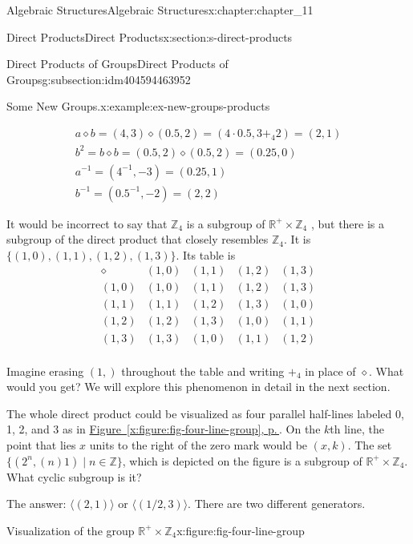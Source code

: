 \documentclass[twoside,10pt,]{book}
\newcommand{\xreffont}{\relax}
\numberwithin{equation}{section}
\begin{document}
\begin{chapterptx}{Algebraic Structures}{}{Algebraic Structures}{}{}{x:chapter:chapter_11}
\begin{sectionptx}{Direct Products}{}{Direct Products}{}{}{x:section:s-direct-products}
\begin{subsectionptx}{Direct Products of Groups}{}{Direct Products of Groups}{}{}{g:subsection:idm404594463952}
\begin{example}{Some New Groups.}{x:example:ex-new-groups-products}
\begin{enumerate}[label=(\alph*)]
\begin{equation*}
\begin{array}{c}
a \diamond  b = (4, 3) \diamond  (0.5, 2) = \left(4 \cdot  0.5, 3 +_4 2\right) = (2, 1)\\
b^2 = b \diamond  b = (0.5, 2) \diamond  (0.5, 2) = (0.25, 0)\\
a^{-1} = \left(4^{-1} , -3\right) = (0.25, 1)\\
b^{-1} = \left(0.5^{-1} , -2\right) = (2, 2)
\end{array}
\end{equation*}
%
\par
It would be incorrect to say that \(\mathbb{Z}_4\) is a subgroup of \(\mathbb{R}^+\times  \mathbb{Z}_4\) , but there is a subgroup of the direct product that closely resembles \(\mathbb{Z}_4\). It is \(\{(1, 0), (1, 1), (1, 2), (1, 3)\}\). Its table is%
\begin{equation*}
\begin{array}{c|cccc}
\diamond &(1, 0)& (1, 1)& (1, 2)& (1, 3)\\
\hline
(1, 0)&(1, 0)& (1, 1)& (1, 2)& (1, 3)\\
(1, 1)&(1, 1)& (1, 2)& (1, 3)& (1, 0)\\
(1, 2)&(1, 2)& (1, 3)& (1, 0)& (1, 1)\\
(1, 3)&(1, 3)& (1, 0)& (1, 1)& (1, 2)\\
\end{array}
\end{equation*}
%
\par
Imagine erasing \((1, )\) throughout the table and writing \(+_4\) in place of \(\diamond\). What would you get? We will explore this phenomenon in detail in the next section.%
\par
The whole direct product could be visualized as four parallel half-lines labeled 0, 1, 2, and 3 as in \hyperref[x:figure:fig-four-line-group]{Figure~{\xreffont\ref{x:figure:fig-four-line-group}}, p.\,\pageref{x:figure:fig-four-line-group}}. On the \(k\)th line, the point that lies \(x\) units to the right of the zero mark would be \((x,k)\). The set \(\{(2^n, (n)1) \mid n \in \mathbb{Z}\}\), which is depicted on the figure is a subgroup of \(\mathbb{R}^+\times  \mathbb{Z}_4\). What cyclic subgroup is it?%
\par
The answer: \(\langle (2, 1)\rangle\) or \(\langle(1/2, 3)\rangle\).  There are two different generators.%
\end{enumerate}
%
\begin{figureptx}{Visualization of the group \(\mathbb{R}^+ \times  \mathbb{Z}_4\)}{x:figure:fig-four-line-group}{}%

\end{figureptx}
\end{example}
\end{subsectionptx}
\end{sectionptx}
\end{chapterptx}
\end{document}
